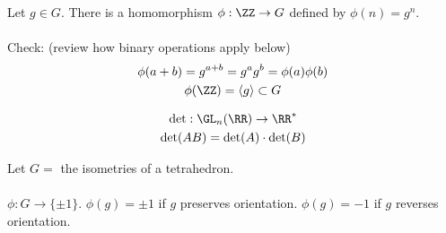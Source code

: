 \documentclass[class=scrartcl, crop=false]{standalone}
\begin{document}
\begin{example}
  Let $g \in G$. There is a homomorphism $\phi:\ZZ \to G$ defined by $\phi(n) = g^n$.
  \\\\
  Check: (review how binary operations apply below)
  \begin{gather*}
    \phi(a + b) = g^{a + b} = g^ag^b = \phi(a)\phi(b) \\
    \phi(\ZZ) = \langle g \rangle \subset G
  \end{gather*}
\end{example}
\begin{example}
  \begin{gather*}
    \det: \GL_n(\RR) \to \RR^* \\
    \det(AB) = \det(A) \cdot \det(B)
  \end{gather*}
\end{example}
\begin{example}
  Let $G = $ the isometries of a tetrahedron.
  \\\\
  $\phi:G \to \{\pm 1\}$. $\phi(g) = \pm 1$ if $g$ preserves orientation. $\phi(g) = -1$ if $g$ reverses orientation.
\end{example}
\end{document}
